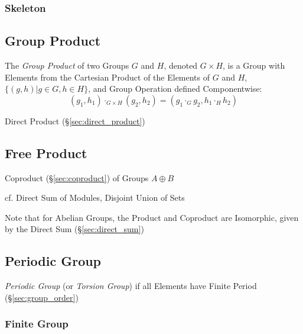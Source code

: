 \subsubsection{Skeleton}\label{sec:group_skeleton}



\subsection{Group Product}\label{sec:group_product}

The \emph{Group Product} of two Groups $G$ and $H$, denoted $G \times
H$, is a Group with Elements from the Cartesian Product of the
Elements of $G$ and $H$, $\{(g,h) | g \in G, h \in H\}$, and Group
Operation defined Componentwise:
\[
    (g_1, h_1) \cdot_{G \times H} (g_2, h_2)
    = (g_1 \cdot_G g_2, h_1 \cdot_H h_2)
\]

Direct Product (\S\ref{sec:direct_product})



\subsection{Free Product}\label{sec:free_product}

Coproduct (\S\ref{sec:coproduct}) of Groups $A \oplus B$

cf. Direct Sum of Modules, Disjoint Union of Sets

\HandRight\; Note that for Abelian Groups, the Product and Coproduct
are Isomorphic, given by the Direct Sum (\S\ref{sec:direct_sum})



\subsection{Periodic Group}\label{sec:periodic_group}

\emph{Periodic Group} (or \emph{Torsion Group}) if all Elements have
Finite Period (\S\ref{sec:group_order})



\subsubsection{Finite Group}\label{sec:finite_group}

